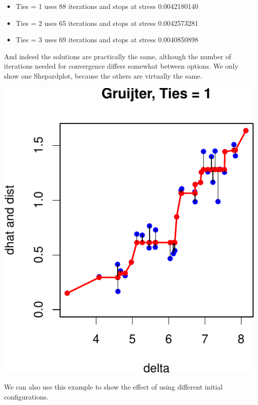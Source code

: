 \documentclass[
  12pt,
]{article}
\providecommand{\tightlist}{%
  \setlength{\itemsep}{0pt}\setlength{\parskip}{0pt}}
\begin{document}
\begin{itemize}
\tightlist
\item
  Ties = 1 uses 88 iterations and stops at stress 0.0042180140
\item
  Ties = 2 uses 65 iterations and stops at stress 0.0042573281
\item
  Ties = 3 uses 69 iterations and stops at stress 0.0040850898
\end{itemize}

And indeed the solutions are practically the same, although the number of iterations needed for convergence
differs somewhat between options. We only show one Shepardplot, because the others are virtually the same.

\begin{center}\includegraphics{smacofRO_files/figure-latex/plotgruijter-1} \end{center}

We can also use this example to show the effect of using different initial configurations.
\end{document}

